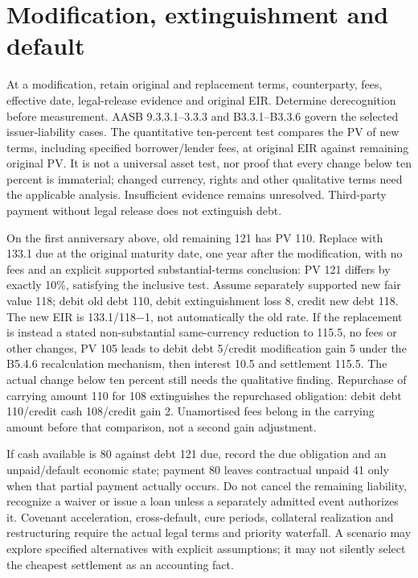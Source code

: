 \hypertarget{modification-extinguishment-and-default}{%
\section{Modification, extinguishment and default}\label{method-financing-methods-modification-extinguishment-and-default}}

At a modification, retain original and replacement terms, counterparty, fees, effective date, legal-release evidence and original EIR. Determine derecognition before measurement. AASB 9.3.3.1--3.3.3 and B3.3.1--B3.3.6 govern the selected issuer-liability cases. The quantitative ten-percent test compares the PV of new terms, including specified borrower/lender fees, at original EIR against remaining original PV. It is not a universal asset test, nor proof that every change below ten percent is immaterial; changed currency, rights and other qualitative terms need the applicable analysis. Insufficient evidence remains unresolved. Third-party payment without legal release does not extinguish debt.

On the first anniversary above, old remaining 121 has PV 110. Replace with 133.1 due at the original maturity date, one year after the modification, with no fees and an explicit supported substantial-terms conclusion: PV 121 differs by exactly 10\%, satisfying the inclusive test. Assume separately supported new fair value 118; debit old debt 110, debit extinguishment loss 8, credit new debt 118. The new EIR is 133.1/118\ensuremath{-}1, not automatically the old rate. If the replacement is instead a stated non-substantial same-currency reduction to 115.5, no fees or other changes, PV 105 leads to debit debt 5/credit modification gain 5 under the B5.4.6 recalculation mechanism, then interest 10.5 and settlement 115.5. The actual change below ten percent still needs the qualitative finding. Repurchase of carrying amount 110 for 108 extinguishes the repurchased obligation: debit debt 110/credit cash 108/credit gain 2. Unamortised fees belong in the carrying amount before that comparison, not a second gain adjustment.

If cash available is 80 against debt 121 due, record the due obligation and an unpaid/default economic state; payment 80 leaves contractual unpaid 41 only when that partial payment actually occurs. Do not cancel the remaining liability, recognize a waiver or issue a loan unless a separately admitted event authorizes it. Covenant acceleration, cross-default, cure periods, collateral realization and restructuring require the actual legal terms and priority waterfall. A scenario may explore specified alternatives with explicit assumptions; it may not silently select the cheapest settlement as an accounting fact.

